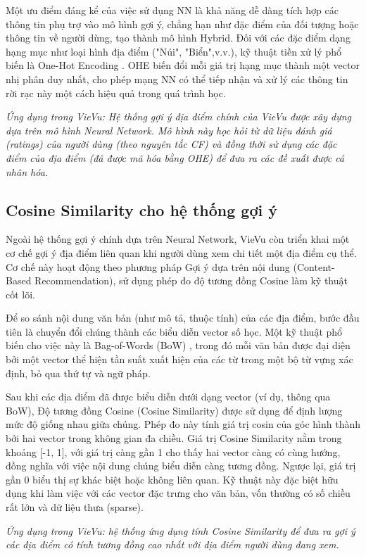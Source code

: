Một ưu điểm đáng kể của việc sử dụng NN là khả năng dễ dàng tích hợp các thông tin phụ trợ vào mô hình gợi ý, chẳng hạn như đặc điểm của đối tượng hoặc thông tin về người dùng, tạo thành mô hình Hybrid. Đối với các đặc điểm dạng hạng mục như loại hình địa điểm ("Núi", "Biển",v.v.), kỹ thuật tiền xử lý phổ biến là One-Hot Encoding  \cite{ohe_concept}. OHE biến đổi mỗi giá trị hạng mục thành một vector nhị phân duy nhất, cho phép mạng NN có thể tiếp nhận và xử lý các thông tin rời rạc này một cách hiệu quả trong quá trình học.

\textit{Ứng dụng trong VieVu: Hệ thống gợi ý địa điểm chính của VieVu được xây dựng dựa trên mô hình Neural Network. Mô hình này học hỏi từ dữ liệu đánh giá (ratings) của người dùng (theo nguyên tắc CF) và đồng thời sử dụng các đặc điểm của địa điểm (đã được mã hóa bằng OHE) để đưa ra các đề xuất được cá nhân hóa.}


\subsection{Cosine Similarity cho hệ thống gợi ý}



Ngoài hệ thống gợi ý chính dựa trên Neural Network, VieVu còn triển khai một cơ chế gợi ý địa điểm liên quan khi người dùng xem chi tiết một địa điểm cụ thể. Cơ chế này hoạt động theo phương pháp Gợi ý dựa trên nội dung (Content-Based Recommendation), sử dụng phép đo độ tương đồng Cosine làm kỹ thuật cốt lõi.

Để so sánh nội dung văn bản (như mô tả, thuộc tính) của các địa điểm, bước đầu tiên là chuyển đổi chúng thành các biểu diễn vector số học. Một kỹ thuật phổ biến cho việc này là Bag-of-Words (BoW) \cite{bow_concept}, trong đó mỗi văn bản được đại diện bởi một vector thể hiện tần suất xuất hiện của các từ trong một bộ từ vựng xác định, bỏ qua thứ tự và ngữ pháp.

Sau khi các địa điểm đã được biểu diễn dưới dạng vector (ví dụ, thông qua BoW), Độ tương đồng Cosine (Cosine Similarity) \cite{cosine_similarity_concept} được sử dụng để định lượng mức độ giống nhau giữa chúng. Phép đo này tính giá trị cosin của góc hình thành bởi hai vector trong không gian đa chiều. Giá trị Cosine Similarity nằm trong khoảng [-1, 1], với giá trị càng gần 1 cho thấy hai vector càng có cùng hướng, đồng nghĩa với việc nội dung chúng biểu diễn càng tương đồng. Ngược lại, giá trị gần 0 biểu thị sự khác biệt hoặc không liên quan. Kỹ thuật này đặc biệt hữu dụng khi làm việc với các vector đặc trưng cho văn bản, vốn thường có số chiều rất lớn và dữ liệu thưa (sparse).

\textit{Ứng dụng trong VieVu: hệ thống ứng dụng tính Cosine Similarity để đưa ra gợi ý các địa điểm có tính tương đồng cao nhất với địa điểm người dùng đang xem. }
